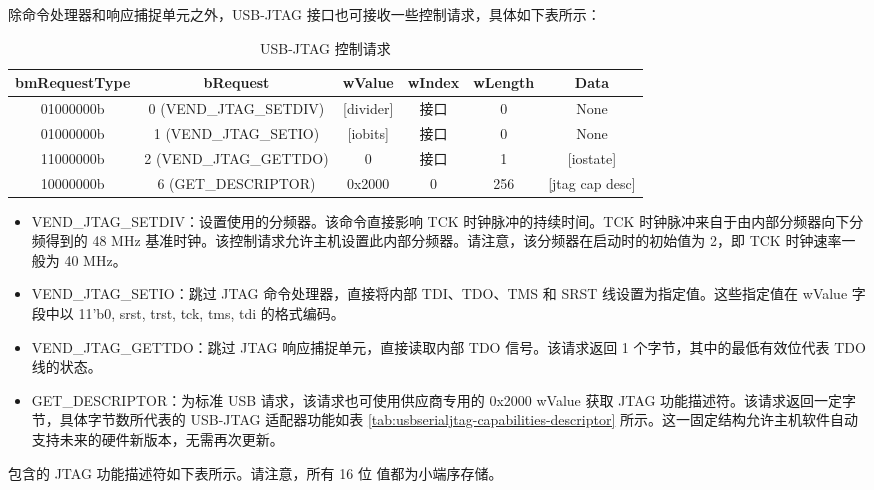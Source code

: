 \documentclass[main\_\_CN.tex]{subfiles}
\begin{document}
除命令处理器和响应捕捉单元之外，USB-JTAG 接口也可接收一些控制请求，具体如下表所示：

\begin{table}[H]
    \centering
    \caption{USB-JTAG 控制请求}
    \label{tab:usbserialjtag-control-requests}
    \begin{tabular}{|c|c|c|c|c|c|}
    \hline
       \rowcolor{lightgray}
       \textbf{bmRequestType} & \textbf{bRequest} & \textbf{wValue} & \textbf{wIndex} & \textbf{wLength} & \textbf{Data} \\\hline

       01000000b &  0 (VEND\_JTAG\_SETDIV) & [divider] & 接口 & 0 &  None \\\hline
       01000000b &  1 (VEND\_JTAG\_SETIO) &  [iobits] &  接口 & 0 &   None \\\hline
       11000000b &  2 (VEND\_JTAG\_GETTDO) & 0 & 接口 & 1 & [iostate] \\\hline
       10000000b &  6 (GET\_DESCRIPTOR) &   0x2000 &  0 &  256 & [jtag cap desc] \\\hline
    \end{tabular}
\end{table}

\begin{itemize}
\item VEND\_JTAG\_SETDIV：设置使用的分频器。该命令直接影响 TCK 时钟脉冲的持续时间。TCK 时钟脉冲来自于由内部分频器向下分频得到的 48 MHz 基准时钟。该控制请求允许主机设置此内部分频器。请注意，该分频器在启动时的初始值为 2，即 TCK 时钟速率一般为 40 MHz。

\item VEND\_JTAG\_SETIO：跳过 JTAG 命令处理器，直接将内部 TDI、TDO、TMS 和 SRST 线设置为指定值。这些指定值在 wValue 字段中以 {11'b0, srst, trst, tck, tms, tdi} 的格式编码。

\item VEND\_JTAG\_GETTDO：跳过 JTAG 响应捕捉单元，直接读取内部 TDO 信号。该请求返回 1 个字节，其中的最低有效位代表 TDO 线的状态。

\item GET\_DESCRIPTOR：为标准 USB 请求，该请求也可使用供应商专用的 0x2000 wValue 获取 JTAG 功能描述符。该请求返回一定字节，具体字节数所代表的 USB-JTAG 适配器功能如表 \ref{tab:usbserialjtag-capabilities-descriptor} 所示。这一固定结构允许主机软件自动支持未来的硬件新版本，无需再次更新。
\end{itemize}

\chipname{} 包含的 JTAG 功能描述符如下表所示。请注意，所有 16 位 值都为小端序存储。
\end{document}
